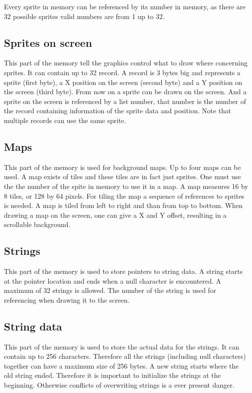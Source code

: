 		\par Every sprite in memory can be referenced by its number in memory, as there are 32 possible sprites valid numbers are from 1 up to 32.

	\subsection{Sprites on screen}
		\par This part of the memory tell the graphics control what to draw where concerning sprites. It can contain up to 32 record. A record is 3 bytes big and represents a sprite (first byte), a X position on the screen (second byte) and a Y position on the screen (third byte). From now on a sprite can be drawn on the screen. And a sprite on the screen is referenced by a list number, that number is the number of the record containing information of the sprite data and position. Note that multiple records can use the same sprite.

	\subsection{Maps}
	\label{subsec:maps}
		\par This part of the memory is used for background maps. Up to four maps can be used. A map exists of tiles and these tiles are in fact just sprites. One must use the the number of the spite in memory to use it in a map. A map measures 16 by 8 tiles, or 128 by 64 pixels. For tiling the map a sequence of references to sprites is needed. A map is tiled from left to right and than from top to bottom. When drawing a map on the screen, one can give a X and Y offset, resulting in a scrollable background.

	\subsection{Strings}
	\label{subsec:strings}
		\par This part of the memory is used to store pointers to string data. A string starts at the pointer location and ends when a null character is encountered. A maximum of 32 strings is allowed. The number of the string is used for referencing when drawing it to the screen.

	\subsection{String data}
	\label{subsec:stringdata}
		\par This part of the memory is used to store the actual data for the strings. It can contain up to 256 characters. Therefore all the strings (including null characters) together can have a maximum size of 256 bytes. A new string starts where the old string ended. Therefore it is important to initialize the strings at the beginning. Otherwise conflicts of overwriting strings is a ever present danger.

